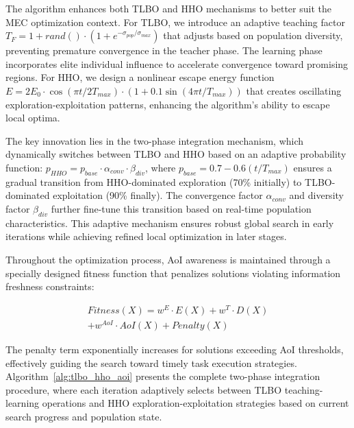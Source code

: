 \documentclass[conference]{IEEEtran}
\begin{document}
The algorithm enhances both TLBO and HHO mechanisms to better suit the MEC optimization context. For TLBO, we introduce an adaptive teaching factor $T_F = 1 + rand() \cdot (1 + e^{-\sigma_{pop}/\sigma_{max}})$ that adjusts based on population diversity, preventing premature convergence in the teacher phase. The learning phase incorporates elite individual influence to accelerate convergence toward promising regions. For HHO, we design a nonlinear escape energy function $E = 2E_0 \cdot \cos(\pi t/2T_{max}) \cdot (1 + 0.1 \sin(4\pi t/T_{max}))$ that creates oscillating exploration-exploitation patterns, enhancing the algorithm's ability to escape local optima.

The key innovation lies in the two-phase integration mechanism, which dynamically switches between TLBO and HHO based on an adaptive probability function: $p_{HHO} = p_{base} \cdot \alpha_{conv} \cdot \beta_{div}$, where $p_{base} = 0.7 - 0.6(t/T_{max})$ ensures a gradual transition from HHO-dominated exploration (70\% initially) to TLBO-dominated exploitation (90\% finally). The convergence factor $\alpha_{conv}$ and diversity factor $\beta_{div}$ further fine-tune this transition based on real-time population characteristics. This adaptive mechanism ensures robust global search in early iterations while achieving refined local optimization in later stages.

Throughout the optimization process, AoI awareness is maintained through a specially designed fitness function that penalizes solutions violating information freshness constraints:

\begin{equation}
    \begin{split}
        Fitness(X) = w^E \cdot E(X) + w^T \cdot D(X) \\ 
        + w^{AoI} \cdot AoI(X) + Penalty(X)
    \end{split}
\end{equation}

The penalty term exponentially increases for solutions exceeding AoI thresholds, effectively guiding the search toward timely task execution strategies. Algorithm~\ref{alg:tlbo_hho_aoi} presents the complete two-phase integration procedure, where each iteration adaptively selects between TLBO teaching-learning operations and HHO exploration-exploitation strategies based on current search progress and population state.
\end{document}
